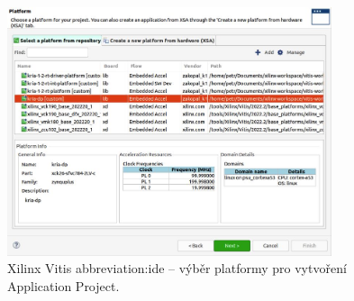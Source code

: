 \documentclass[a4paper, twoside, 11pt]{article}
\begin{document}
		\begin{figure}[htbp!]
			\centering
			\includegraphics[width=0.85\textwidth]{src/jpg/vitis-application-project-platform-selection.jpg}
			\caption{Xilinx Vitis \gls{abbreviation:ide} – výběr platformy pro vytvoření Application Project.}
			\label{fig:vitis-application-project-platform-selection}
		\end{figure}
\end{document}
